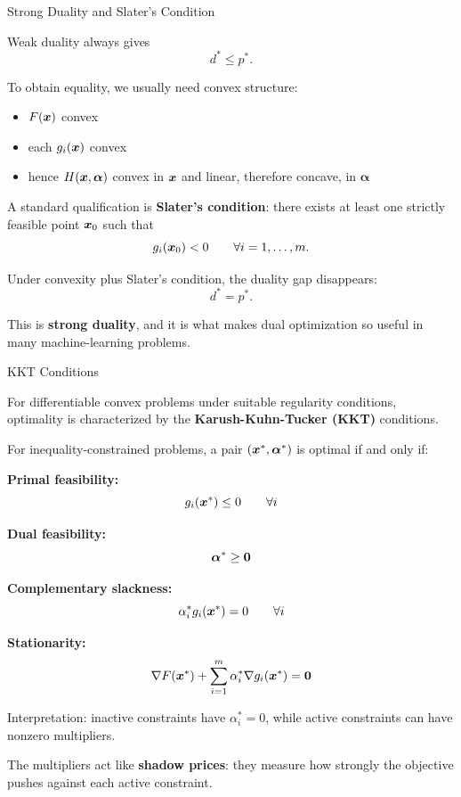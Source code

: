 \documentclass[11pt,compress,t,notes=noshow, xcolor=table]{beamer}
\newcommand{\alphav}{\bm{\alpha}}
\begin{document}
\begin{framei}[fs=small]{Strong Duality and Slater's Condition}
\item Weak duality always gives
$$
d^\ast \le p^\ast.
$$
\item To obtain equality, we usually need convex structure:
\begin{itemize}
\item $F(\bm{x})$ convex
\item each $g_i(\bm{x})$ convex
\item hence $H(\xv,\alphav)$ convex in $\bm{x}$ and linear, therefore concave, in $\alphav$
\end{itemize}
\item A standard qualification is \textbf{Slater's condition}: there exists at least one strictly feasible point $\bm{x}_0$ such that
$$
g_i(\bm{x}_0) < 0
\qquad \forall i=1,\dots,m.
$$
\item Under convexity plus Slater's condition, the duality gap disappears:
$$
d^\ast = p^\ast.
$$
\item This is \textbf{strong duality}, and it is what makes dual optimization so useful in many machine-learning problems.
\end{framei}


\begin{framei}[fs=footnotesize]{KKT Conditions}
\item For differentiable convex problems under suitable regularity conditions, optimality is characterized by the \textbf{Karush-Kuhn-Tucker (KKT)} conditions.
\item For inequality-constrained problems, a pair $(\xv^\ast,\alphav^\ast)$ is optimal if and only if:
\item \textbf{Primal feasibility:}
$$
g_i(\bm{x}^\ast) \le 0
\qquad \forall i
$$
\item \textbf{Dual feasibility:}
$$
\alphav^\ast \ge \zero
$$
\item \textbf{Complementary slackness:}
$$
\alpha_i^\ast g_i(\bm{x}^\ast) = 0
\qquad \forall i
$$
\item \textbf{Stationarity:}
$$
\nabla F(\bm{x}^\ast) + \sum_{i=1}^m \alpha_i^\ast \nabla g_i(\bm{x}^\ast) = \mathbf{0}
$$
\item Interpretation: inactive constraints have $\alpha_i^\ast = 0$, while active constraints can have nonzero multipliers.
\item The multipliers act like \textbf{shadow prices}: they measure how strongly the objective pushes against each active constraint.
\end{framei}
\end{document}
